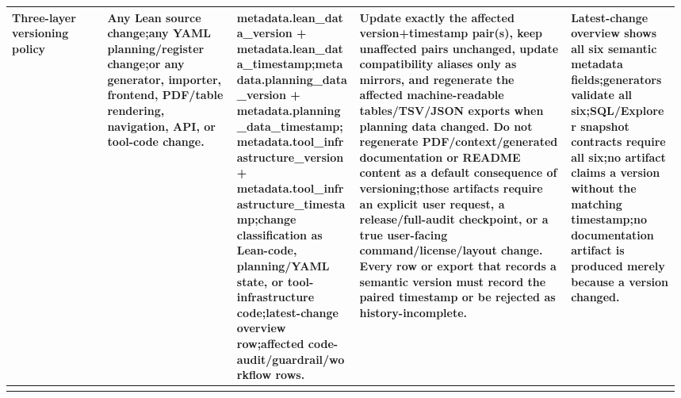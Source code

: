 \begin{longtable}{L{0.14\linewidth} L{0.19\linewidth} L{0.18\linewidth} L{0.31\linewidth} L{0.16\linewidth}}
Three-layer versioning policy & Any Lean source change;\newline any YAML planning/\allowbreak{}register change;\newline or any generator, importer, frontend, PDF/\allowbreak{}table rendering, navigation, API, or tool-code change. & metadata.lean\_data\_version + metadata.lean\_data\_timestamp;\newline metadata.planning\_data\_version + metadata.planning\_data\_timestamp;\newline metadata.tool\_infrastructure\_version + metadata.tool\_infrastructure\_timestamp;\newline change classification as Lean-code, planning/\allowbreak{}YAML state, or tool-infrastructure code;\newline latest-change overview row;\newline affected code-audit/\allowbreak{}guardrail/\allowbreak{}workflow rows. & Update exactly the affected version+timestamp pair(s), keep unaffected pairs unchanged, update compatibility aliases only as mirrors, and regenerate the affected machine-readable tables/\allowbreak{}TSV/\allowbreak{}JSON exports when planning data changed. Do not regenerate PDF/\allowbreak{}context/\allowbreak{}generated documentation or README content as a default consequence of versioning;\newline those artifacts require an explicit user request, a release/\allowbreak{}full-audit checkpoint, or a true user-facing command/\allowbreak{}license/\allowbreak{}layout change. Every row or export that records a semantic version must record the paired timestamp or be rejected as history-incomplete. & Latest-change overview shows all six semantic metadata fields;\newline generators validate all six;\newline SQL/\allowbreak{}Explorer snapshot contracts require all six;\newline no artifact claims a version without the matching timestamp;\newline no documentation artifact is produced merely because a version changed.\\
\hline
\addlinespace[0.24em]

\end{longtable}
